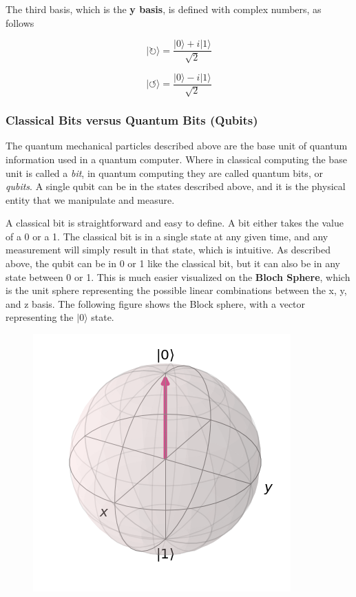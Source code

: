 \documentclass[11pt]{article}
\makeatletter
\def\maxwidth{\ifdim\Gin@nat@width>\linewidth\linewidth
    \else\Gin@nat@width\fi}
\let\Oldincludegraphics\includegraphics
\renewcommand{\includegraphics}[1]{\Oldincludegraphics[width=.8\maxwidth]{#1}}
\makeatother
\begin{document}
The third basis, which is the \textbf{y basis}, is defined with complex
numbers, as follows

\[|\circlearrowright\rangle = \frac{ | 0 \rangle + i | 1 \rangle}{\sqrt{2}}\]

\[|\circlearrowleft\rangle = \frac{ | 0 \rangle -i | 1 \rangle}{\sqrt{2}}\]

    \subsubsection{Classical Bits versus Quantum Bits
(Qubits)}\label{classical-bits-versus-quantum-bits-qubits}

    The quantum mechanical particles described above are the base unit of
quantum information used in a quantum computer. Where in classical
computing the base unit is called a \emph{bit}, in quantum computing
they are called quantum bits, or \emph{qubits}. A single qubit can be in
the states described above, and it is the physical entity that we
manipulate and measure.

A classical bit is straightforward and easy to define. A bit either
takes the value of a 0 or a 1. The classical bit is in a single state at
any given time, and any measurement will simply result in that state,
which is intuitive. As described above, the qubit can be in 0 or 1 like
the classical bit, but it can also be in any state between 0 or 1. This
is much easier visualized on the \textbf{Bloch Sphere}, which is the
unit sphere representing the possible linear combinations between the x,
y, and z basis. The following figure shows the Block sphere, with a
vector representing the \(|0\rangle\) state.

\begin{figure}
\centering
\includegraphics{images/bloch_0.png}
\caption{}
\end{figure}
\end{document}
